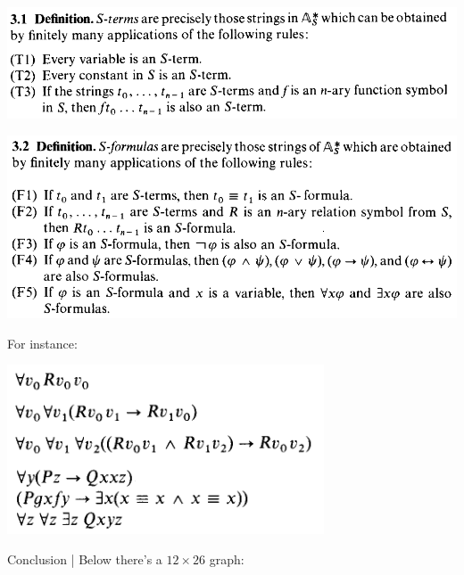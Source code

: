 \documentclass[11pt,a4paper]{article}
\begin{document}
		\begin{center}
		\includegraphics[scale=.5]{31}
		\end{center}

		\begin{center}
		\includegraphics[scale=.5]{32}
		\end{center}

		For instance:

		\begin{center}
		\includegraphics[scale=1]{exemplos}
		\end{center}

		\vspace{120mm}

		Conclusion | Below there's a $12 \times 26$ graph:

		\vspace{3mm}
\end{document}
